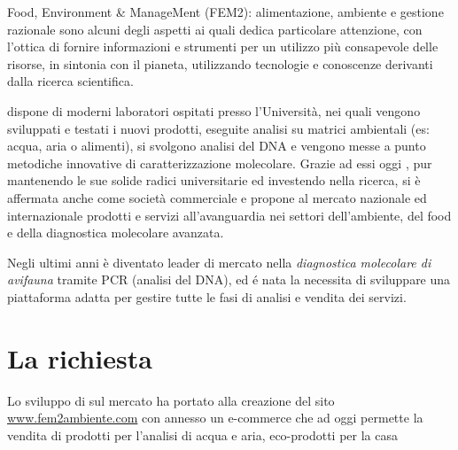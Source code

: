 Food, Environment \& ManageMent (FEM2): alimentazione, ambiente e gestione razionale sono alcuni degli aspetti ai quali {\fem} dedica particolare attenzione, con l'ottica di fornire informazioni e strumenti per un utilizzo più consapevole delle risorse, in sintonia con il pianeta, utilizzando tecnologie e conoscenze derivanti dalla ricerca scientifica.

{\fem} dispone di moderni laboratori ospitati presso l’Università, nei quali vengono sviluppati e testati i nuovi prodotti, eseguite analisi su matrici ambientali (es: acqua, aria o alimenti), si svolgono analisi del DNA e vengono messe a punto metodiche innovative di caratterizzazione molecolare. Grazie ad essi oggi {\fem}, pur mantenendo le sue solide radici universitarie ed investendo nella ricerca, si è affermata anche come società commerciale e propone al mercato nazionale ed internazionale prodotti e servizi all'avanguardia nei settori dell'ambiente, del food e della diagnostica molecolare avanzata.

Negli ultimi anni è diventato leader di mercato nella \emph{diagnostica molecolare di avifauna} tramite PCR (analisi del DNA), ed é nata la necessita di sviluppare una piattaforma adatta per gestire tutte le fasi di analisi e vendita dei servizi.

\section{La richiesta}
\label{sec:richiesta}

Lo sviluppo di {\fem} sul mercato ha portato alla creazione del sito \url{www.fem2ambiente.com} con annesso un e-commerce che ad oggi permette la vendita di prodotti per l'analisi di acqua e aria, eco-prodotti per la casa


